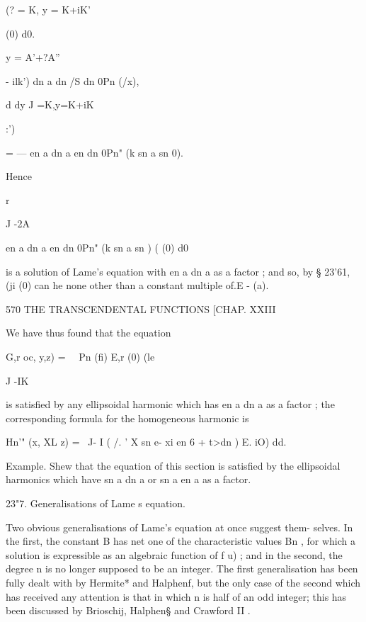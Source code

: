 {{{{{{{{(? = K, y = K+iK'  



(0) d0. 



y = A'+?A'' 



-  ilk') dn a dn /S dn 0Pn (/x), 



d dy J  =K,y=K+iK 



:') 



= —   en a dn a en   dn 0Pn" (k sn a sn 0). 



Hence 



r 

J -2A 



en a dn a en   dn 0Pn" (k sn a sn  ) (  (0) d0 



is a solution of Lame's equation with en a dn a as a factor ; and so, by § 23'61, 
(ji (0) can he none other than a constant multiple of.E - (a). 



570 THE TRANSCENDENTAL FUNCTIONS [CHAP. XXIII 

We have thus found that the equation 

G,r  oc, y,z) = \ \  Pn (fi) E,r (0) (le 

J -IK 

is satisfied by any ellipsoidal harmonic which has en a dn a as a factor ; the 
corresponding formula for the homogeneous harmonic is 

Hn'" (x, XL z) = \    J- I ( /. ' X sn e- xi en 6 + t>dn  )  E. iO) dd. 

Example. Shew that the equation of this section is satisfied by the ellipsoidal 
harmonics which have sn a dn a or sn a en a as a factor. 

23"7. Generalisations of Lame s equation. 

Two obvious generalisations of Lame's equation at once suggest them- 
selves. In the first, the constant B has net one of the characteristic values 
Bn , for which a solution is expressible as an algebraic function of f  u) ; and 
in the second, the degree n is no longer supposed to be an integer. The first 
generalisation has been fully dealt with by Hermite* and Halphenf, but the 
only case of the second which has received any attention is that in which n is 
half of an odd integer; this has been discussed by Brioschij, Halphen§ and 
Crawford II . 

}}}}}}}}

